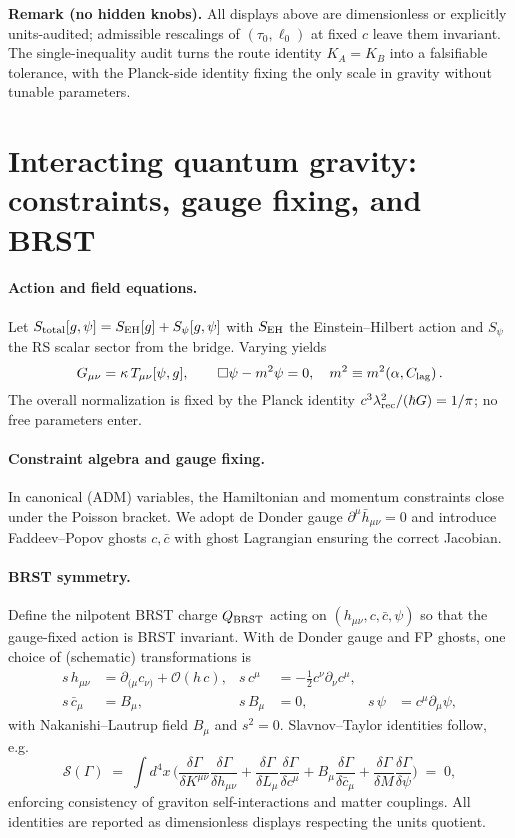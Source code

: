 \documentclass[11pt]{article}
\begin{document}
\medskip
\noindent\textbf{Remark (no hidden knobs).} All displays above are dimensionless or explicitly units-audited; admissible rescalings of $(\tau_0,\ell_0)$ at fixed $c$ leave them invariant. The single-inequality audit turns the route identity $K_A=K_B$ into a falsifiable tolerance, with the Planck-side identity fixing the only scale in gravity without tunable parameters. 

\section{Interacting quantum gravity: constraints, gauge fixing, and BRST}
\label{sec:interacting-qg}

\paragraph{Action and field equations.}
Let $S_{\rm total}[g,\psi]=S_{\rm EH}[g]+S_{\psi}[g,\psi]$ with $S_{\rm EH}$ the Einstein--Hilbert action and $S_{\psi}$ the RS scalar sector from the bridge. Varying yields
\[
G_{\mu\nu}=\kappa\,T_{\mu\nu}[\psi,g],\qquad \Box\psi- m^2\psi=0,\quad m^2 \equiv m^2(\alpha, C_{\rm lag})\,.
\]
The overall normalization is fixed by the Planck identity $c^3\lambda_{\rm rec}^2/(\hbar G)=1/\pi$; no free parameters enter.

\paragraph{Constraint algebra and gauge fixing.}
In canonical (ADM) variables, the Hamiltonian and momentum constraints close under the Poisson bracket. We adopt de Donder gauge $\partial^\mu \bar h_{\mu\nu}=0$ and introduce Faddeev--Popov ghosts $c,\bar c$ with ghost Lagrangian ensuring the correct Jacobian.

\paragraph{BRST symmetry.}
Define the nilpotent BRST charge $Q_{\rm BRST}$ acting on $(h_{\mu\nu},c,\bar c,\psi)$ so that the gauge-fixed action is BRST invariant. With de Donder gauge and FP ghosts, one choice of (schematic) transformations is
\begin{align}
 s\,h_{\mu\nu} &= \partial_{(\mu} c_{\nu)} + \mathcal{O}(h\,c), & s\,c^\mu &= -\tfrac12 c^\nu\partial_\nu c^\mu,\\
 s\,\bar c_\mu &= B_\mu, & s\,B_\mu &= 0, & s\,\psi &= c^\mu\partial_\mu\psi,
\end{align}
with Nakanishi--Lautrup field $B_\mu$ and $s^2\!=\!0$. Slavnov--Taylor identities follow, e.g.
\[
\mathcal{S}(\Gamma) \;=\; \int d^4x\,\Big( \frac{\delta\Gamma}{\delta K^{\mu\nu}}\frac{\delta\Gamma}{\delta h_{\mu\nu}} + \frac{\delta\Gamma}{\delta L_\mu}\frac{\delta\Gamma}{\delta c^\mu} + B_\mu\frac{\delta\Gamma}{\delta \bar c_\mu} + \frac{\delta\Gamma}{\delta M}\frac{\delta\Gamma}{\delta \psi} \Big) \;=\; 0,
\]
enforcing consistency of graviton self-interactions and matter couplings. All identities are reported as dimensionless displays respecting the units quotient.
\end{document}
